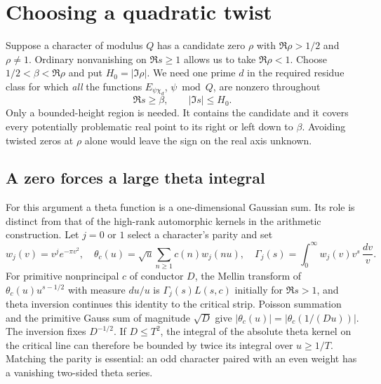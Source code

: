\section{Choosing a quadratic twist}\label{sec:twist}
Suppose a character of modulus \(Q\) has a candidate zero \(\rho\) with \(\Re\rho>1/2\) and \(\rho\ne1\). Ordinary nonvanishing on \(\Re s\ge1\) allows us to take \(\Re\rho<1\). Choose \(1/2<\beta<\Re\rho\) and put \(H_0=|\Im\rho|\). We need one prime \(d\) in the required residue class for which \emph{all} the functions \(E_{\psi\chi_d}\), \(\psi\bmod Q\), are nonzero throughout
\[
            \Re s\ge\beta,\qquad |\Im s|\le H_0.
\]
Only a bounded-height region is needed. It contains the candidate and it covers every potentially problematic real point to its right or left down to \(\beta\). Avoiding twisted zeros at \(\rho\) alone would leave the sign on the real axis unknown.

\subsection{A zero forces a large theta integral}
For this argument a theta function is a one-dimensional Gaussian sum. Its role is distinct from that of the high-rank automorphic kernels in the arithmetic construction. Let \(j=0\) or \(1\) select a character's parity and set
\[
 w_j(v)=v^j e^{-\pi v^2},\quad
 \theta_c(u)=\sqrt u\sum_{n\ge1}c(n)w_j(nu),\quad
 \Gamma_j(s)=\int_0^\infty w_j(v)v^s\,\frac{dv}{v}.
\]
For primitive nonprincipal \(c\) of conductor \(D\), the Mellin transform of \(\theta_c(u)u^{s-1/2}\) with measure \(du/u\) is \(\Gamma_j(s)L(s,c)\) initially for \(\Re s>1\), and theta inversion continues this identity to the critical strip. Poisson summation and the primitive Gauss sum of magnitude \(\sqrt D\) give \(|\theta_c(u)|=|\theta_c(1/(Du))|\). The inversion fixes \(D^{-1/2}\). If \(D\le T^2\), the integral of the absolute theta kernel on the critical line can therefore be bounded by twice its integral over \(u\ge1/T\). Matching the parity is essential: an odd character paired with an even weight has a vanishing two-sided theta series.

